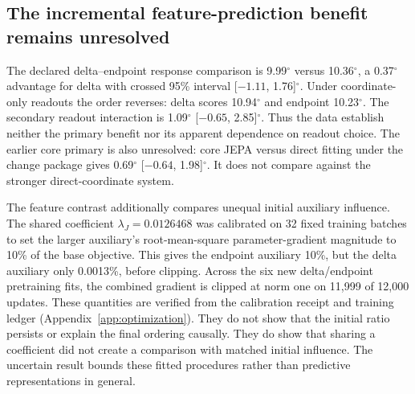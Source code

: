 \documentclass{article}
\newcommand{\dg}{^{\circ}}
\begin{document}
\begin{table}[t]\centering\small
\caption{Exploratory response errors by observation and nominal edit, in degrees. Direct uses coordinate supervision and joint fitting; endpoint and delta use frozen encoders with the original change readout. All groups contain the same 14 people and three seeds. The last column is a paired zero-minus-direct effect with crossed 95\% interval; positive favors direct. Original 720$\dg$ failure scoring is retained.}
\label{tab:strata}
\setlength{\tabcolsep}{3.5pt}
\end{table}

\subsection{The incremental feature-prediction benefit remains unresolved}
\label{sec:feature}
The declared delta--endpoint response comparison is 9.99$\dg$ versus 10.36$\dg$, a 0.37$\dg$ advantage for delta with crossed 95\% interval [$-1.11$, 1.76]$\dg$. Under coordinate-only readouts the order reverses: delta scores 10.94$\dg$ and endpoint 10.23$\dg$. The secondary readout interaction is 1.09$\dg$ [$-0.65$, 2.85]$\dg$. Thus the data establish neither the primary benefit nor its apparent dependence on readout choice. The earlier core primary is also unresolved: core JEPA versus direct fitting under the change package gives 0.69$\dg$ [$-0.64$, 1.98]$\dg$. It does not compare against the stronger direct-coordinate system.

The feature contrast additionally compares unequal initial auxiliary influence. The shared coefficient $\lambda_J=0.0126468$ was calibrated on 32 fixed training batches to set the larger auxiliary's root-mean-square parameter-gradient magnitude to 10\% of the base objective. This gives the endpoint auxiliary 10\%, but the delta auxiliary only 0.0013\%, before clipping. Across the six new delta/endpoint pretraining fits, the combined gradient is clipped at norm one on 11,999 of 12,000 updates. These quantities are verified from the calibration receipt and training ledger (Appendix~\ref{app:optimization}). They do not show that the initial ratio persists or explain the final ordering causally. They do show that sharing a coefficient did not create a comparison with matched initial influence. The uncertain result bounds these fitted procedures rather than predictive representations in general.
\end{document}
